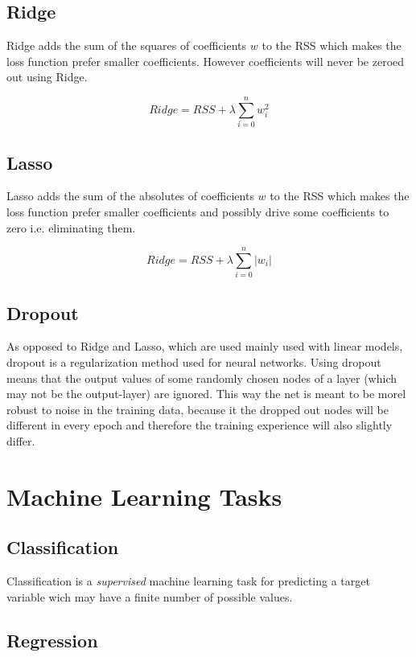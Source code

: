 \subsection{Ridge}

Ridge adds the sum of the squares of coefficients $w$ to the RSS which makes the loss function prefer smaller coefficients. However coefficients will never be zeroed out using Ridge.

$$
    Ridge = RSS + \lambda \sum_{i=0}^{n} w_{i}^{2}
$$

\subsection{Lasso}

Lasso adds the sum of the absolutes of coefficients $w$ to the RSS which makes the loss function prefer smaller coefficients and possibly drive some coefficients to zero i.e. eliminating them.

$$
    Ridge = RSS + \lambda \sum_{i=0}^{n} |w_{i}|
$$


\subsection{Dropout}

As opposed to Ridge and Lasso, which are used mainly used with linear models, dropout is a regularization method used for neural networks. Using dropout means that the output values of some randomly chosen nodes of a layer (which may not be the output-layer) are ignored. This way the net is meant to be morel robust to noise in the training data, because it the dropped out nodes will be different in every epoch and therefore the training experience will also slightly differ.

\section{Machine Learning Tasks}

\subsection{Classification}

Classification is a \textit{supervised} machine learning task for predicting a target variable wich may have a finite number of possible values.

\subsection{Regression}

